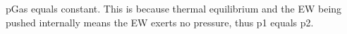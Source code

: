 pGas equals constant. This is because thermal equilibrium and the EW being pushed internally means the EW exerts no pressure, thus p1 equals p2.